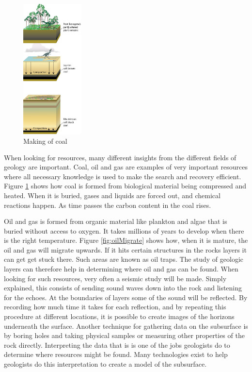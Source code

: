 \documentclass[a4paper,12pt]{report}
\begin{document}
\begin{figure}
  \begin{center}
   \vspace{-15pt}
    \includegraphics[width=0.28\textwidth]{thesis/geo/english/coal.jpg}
  \end{center}
   \vspace{-15pt}
  \caption{Making of coal}
   \vspace{-15pt}
  \label{fig:coal}
\end{figure}
When looking for resources, many different insights from the different fields of geology are important. Coal, oil and gas are examples of very important resources where all necessary knowledge is used to make the search and recovery efficient. Figure \ref{fig:coal} shows how coal is formed from biological material being compressed and heated. When it is buried, gases and liquids are forced out, and chemical reactions happen. As time passes the carbon content in the coal rises.




Oil and gas is formed from organic material like plankton and algae that is buried without access to oxygen. It takes millions of years to develop when there is the right temperature. Figure \ref{fig:oilMigrate} shows how, when it is mature, the oil and gas will migrate upwards. If it hits certain structures in the rocks layers it can get get stuck there. Such areas are known as oil traps. The study of geologic layers can therefore help in determining where oil and gas can be found. When looking for such resources, very often a seismic study will be made. Simply explained, this consists of sending sound waves down into the rock and listening for the echoes. At the boundaries of layers some of the sound will be reflected. By recording how much time it takes for each reflection, and by repeating this procedure at different locations, it is possible to create images of the horizons underneath the surface. Another technique for gathering data on the subsurface is by boring holes and taking physical samples or 
measuring other properties of the rock directly. Interpreting the data that is is one of the jobs geologists do to determine where resources might be found. Many technologies exist to help geologists do this interpretation to create a model of the subsurface.
\end{document}
